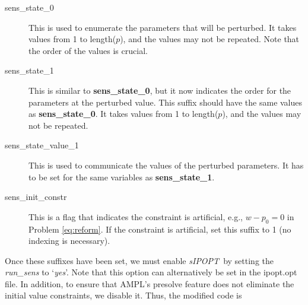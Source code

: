 \documentclass[letter, 11pt]{article}
\newcommand{\sensKKT}{\emph{sIPOPT}}
\newcommand{\AMPL}{AMPL}
\newcommand{\runaskkt}{run\_sens}
\newcommand{\statez}{sens\_state\_0}
\newcommand{\stateo}{sens\_state\_1}
\newcommand{\statevo}{sens\_state\_value\_1}
\newcommand{\initc}{sens\_init\_constr}
\begin{document}
\begin{description}
\item[\statez] This is used to enumerate the parameters that will be perturbed. It takes values from 1 to length($p$), and
                      the values may not be repeated. Note that the order of the values is crucial.
\item[\stateo] This is similar to \textbf{\statez}, but it now indicates the order for the parameters at the perturbed value.
                      This suffix should have the same values as \textbf{\statez}. It takes values from 1 to length($p$), and
                      the values may not be repeated.
\item[\statevo] This is used to communicate the values of the perturbed parameters.
                             It has to be set for the same variables as \textbf{\stateo}.
\item[\initc] This is a flag that indicates the constraint is artificial, e.g., $w - p_0=0$ in Problem \eqref{eq:reform}.
                          If the constraint is artificial, set this suffix to 1 (no indexing is necessary).
\end{description}

Once these suffixes have been set, we must enable \sensKKT\ by setting the \emph{\runaskkt} to `\emph{yes}'. Note that
this option can alternatively be set in the ipopt.opt file. In addition, to ensure that
\AMPL's presolve feature does not eliminate the initial value constraints, we disable it. Thus, the modified code is
\end{document}
